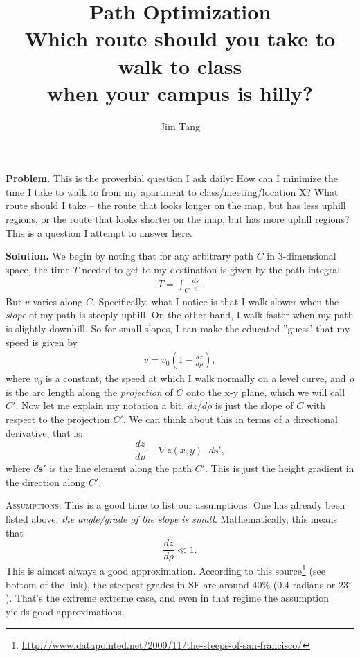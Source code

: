 \documentclass[12pt]{article}
\title{Path Optimization \\[0.5em] \large{Which route should you take to walk to class \\ when your campus is hilly?}}
\author{Jim Tang}
\begin{document}
  \maketitle

\textbf{Problem.} This is the proverbial question I ask daily: How can I minimize the time I take to walk to from my apartment to class/meeting/location X? What route should I take -- the route that looks longer on the map, but has less uphill regions, or the route that looks shorter on the map, but has more uphill regions? This is a question I attempt to answer here.

\vspace{10pt} \textbf{Solution.} We begin by noting that for any arbitrary path $C$ in 3-dimensional space, the time $T$ needed to get to my destination is given by the path integral
\begin{align} \label{eq:1-start}
T = \int_C{\frac{ds}{v}}.
\end{align}
But $v$ varies along $C$. Specifically, what I notice is that I walk slower when the \textit{slope} of my path is steeply uphill. On the other hand, I walk faster when my path is slightly downhill. So for small slopes, I can make the educated ''guess' that my speed is given by
\begin{align} \label{eq:2-vdef}
v = v_{0} \left( 1 - \frac{dz}{d\rho} \right),
\end{align}
where $v_{0}$ is a constant, the speed at which I walk normally on a level curve, and $\rho$ is the arc length along the \textit{projection} of $C$ onto the x-y plane, which we will call $C'$. Now let me explain my notation a bit. $dz/d\rho$ is just the slope of $C$ with respect to the projection $C'$. We can think about this in terms of a directional derivative, that is:
$$
\frac{dz}{d\rho} \equiv \nabla z(x,y) \cdot d \mathbf{s'},
$$
where $d\mathbf{s'}$ is the line element along the path $C'$. This is just the height gradient in the direction along $C'$.

\vspace{10pt} \textsc{Assumptions.} This is a good time to list our assumptions. One has already been listed above: \textit{the angle/grade of the slope is small}. Mathematically, this means that
$$
\frac{dz}{d\rho} \ll 1.
$$
This is almost always a good approximation. According to this source\footnote{\url{http://www.datapointed.net/2009/11/the-steeps-of-san-francisco/}} (see bottom of the link), the steepest grades in SF are around 40\% (0.4 radians or 23$^\circ$). That's the extreme extreme case, and even in that regime the assumption yields good approximations.
\end{document}
